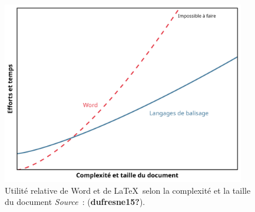 \documentclass[
  letterpaper,
  DIV=11,
  numbers=noendperiod]{scrreprt}
\begin{document}
\begin{figure}

{\centering \includegraphics[width=4.18in,height=\textheight]{images/chapitre5_word-vs-latex.png}

}

\caption{\label{fig-latex-vs-word}Utilité relative de Word et de
\LaTeX~selon la complexité et la taille du document
\newline \textit{Source}~: (\textbf{dufresne15?}).}

\end{figure}
\end{document}
